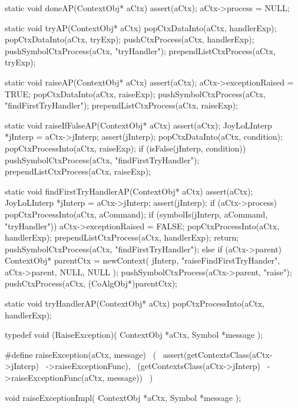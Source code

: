 \startCCode
static void doneAP(ContextObj* aCtx) {
  assert(aCtx);
  aCtx->process = NULL;
}
\stopCCode

\startCCode
static void tryAP(ContextObj* aCtx) {
  popCtxDataInto(aCtx, handlerExp);
  popCtxDataInto(aCtx, tryExp);
  pushCtxProcess(aCtx, handlerExp);
  pushSymbolCtxProcess(aCtx, "tryHandler");
  prependListCtxProcess(aCtx, tryExp);
}
\stopCCode

\startCCode
static void raiseAP(ContextObj* aCtx) {
  assert(aCtx);
  aCtx->exceptionRaised = TRUE;
  popCtxDataInto(aCtx, raiseExp);
  pushSymbolCtxProcess(aCtx, "findFirstTryHandler");
  prependListCtxProcess(aCtx, raiseExp);
}
\stopCCode

\startCCode
static void raiseIfFalseAP(ContextObj* aCtx) {
  assert(aCtx);
  JoyLoLInterp *jInterp = aCtx->jInterp;
  assert(jInterp);
  popCtxDataInto(aCtx, condition);
  popCtxProcessInto(aCtx, raiseExp);
  if (isFalse(jInterp, condition)) {
    pushSymbolCtxProcess(aCtx, "findFirstTryHandler");
    prependListCtxProcess(aCtx, raiseExp);
  }
}
\stopCCode

\startCCode
static void findFirstTryHandlerAP(ContextObj* aCtx) {
  assert(aCtx);
  JoyLoLInterp *jInterp = aCtx->jInterp;
  assert(jInterp);
  if (aCtx->process) {
    popCtxProcessInto(aCtx, aCommand);
    if (symbolIs(jInterp, aCommand, "tryHandler")) {
      aCtx->exceptionRaised = FALSE;
      popCtxProcessInto(aCtx, handlerExp);
      prependListCtxProcess(aCtx, handlerExp);
      return;
    }
    pushSymbolCtxProcess(aCtx, "findFirstTryHandler");
  } else {
    if (aCtx->parent) {
      ContextObj* parentCtx = newContext(
        jInterp,
        "raiseFindFirstTryHander",
        aCtx->parent,
        NULL,
        NULL
      );
      pushSymbolCtxProcess(aCtx->parent, "raise");
      pushCtxProcess(aCtx, (CoAlgObj*)parentCtx);
    }
  }
}
\stopCCode

\startCCode
static void tryHandlerAP(ContextObj* aCtx) {
  popCtxProcessInto(aCtx, handlerExp);
}
\stopCCode

\startCHeader
typedef void (RaiseException)(
  ContextObj *aCtx,
  Symbol     *message
);

#define raiseException(aCtx, message)       \
  (                                         \
    assert(getContextsClass(aCtx->jInterp)  \
      ->raiseExceptionFunc),                \
    (getContextsClass(aCtx->jInterp)        \
      ->raiseExceptionFunc(aCtx, message))  \
  )
\stopCHeader

\setCHeaderStream{private}
\startCHeader
void raiseExceptionImpl(
  ContextObj *aCtx,
  Symbol     *message
);
\stopCHeader
{}

